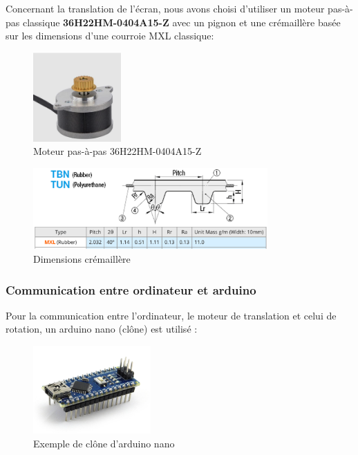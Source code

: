 Concernant la translation de l'écran, nous avons choisi d'utiliser un moteur pas-à-pas classique \textbf{36H22HM-0404A15-Z} avec un pignon et une crémaillère basée sur les
dimensions d'une courroie MXL classique\cite{dimensions_courroies_mxl}\footnotemark :
\begin{figure}[H]
    \centering
    \includegraphics[width=0.3\textwidth]{assets/figures/ameliorations/36H22HM-0404A15-Z.png}
    \caption[Moteur 36H22HM-0404A15-Z]{Moteur pas-à-pas 36H22HM-0404A15-Z\autocite{moteur_translation_site}\footnotemark}
\end{figure}

\begin{figure}[H]
    \centering
    \includegraphics[width=0.8\textwidth]{assets/figures/ameliorations/dimensions_cremaillere.png}
    \caption[Dimensions crémaillère]{Dimensions crémaillère\autocite{dimensions_courroies_mxl}}
\end{figure}




\subsubsection{Communication entre ordinateur et arduino}

Pour la communication entre l'ordinateur, le moteur de translation et celui de rotation, un arduino nano (clône) est utilisé :
\begin{figure}[H]
    \centering
    \includegraphics[width = 0.4\textwidth]{assets/figures/ameliorations/arduino_nano.jpg}
    \caption[Exemple de clône d'arduino nano]{Exemple de clône d'arduino nano \autocite{clone_nano}}
\end{figure}


